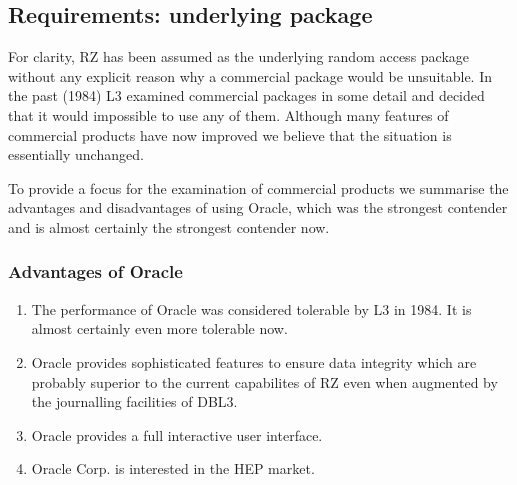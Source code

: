 \subsection{Requirements: underlying package}

For clarity, RZ has been assumed as the underlying random access package without
any explicit reason why a commercial package would be unsuitable.  In the past
(1984) L3 examined commercial packages in some detail and decided that it would
impossible to use any of them.  Although many features of commercial products
have now improved we believe that the situation is essentially unchanged.

To provide a focus for the examination of commercial products we summarise the
advantages and disadvantages of using Oracle, which was the strongest contender
and is almost certainly the strongest contender now.

\subsubsection{Advantages of Oracle}
\begin{enumerate}
\item
The performance of Oracle was considered tolerable by L3 in 1984.  It is
almost certainly even more tolerable now.
\item
Oracle provides sophisticated features to ensure data integrity which are
probably superior to the current capabilites of RZ even when augmented by
the journalling facilities of DBL3.
\item
Oracle provides a full interactive user interface.
\item
Oracle Corp. is interested in the HEP market.
\end{enumerate}

